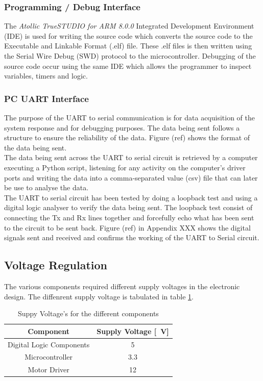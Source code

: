 \subsubsection{Programming / Debug Interface}
The \textit{Atollic TrueSTUDIO for ARM 8.0.0} Integrated Development Environment (IDE) is used for writing the source code which converts the source code to the Executable and Linkable Format (.elf) file. These .elf files is then written using the Serial Wire Debug (SWD) protocol to the microcontroller. Debugging of the source code occur using the same IDE which allows the programmer to inspect variables, timers and logic.

\subsubsection{PC UART Interface }

The purpose of the UART to serial communication is for data acquisition of the system response and for debugging purposes. The data being sent follows a structure to ensure the reliability of the data. Figure (ref) shows the format of the data being sent.\\

The data being sent across the UART to serial circuit is retrieved by a computer executing a Python script, listening for any activity on the computer's driver ports and writing the data into a comma-separated value (csv) file that can later be use to analyse the data.\\

The UART to serial circuit has been tested by doing a loopback test and using a digital logic analyser to verify the data being sent. The loopback test consist of connecting the Tx and Rx lines together and forcefully echo what has been sent to the circuit to be sent back. Figure (ref) in Appendix XXX shows the digital signals sent and received and confirms the working of the UART to Serial circuit. 

\subsection{Voltage Regulation}

The various components required different supply voltages in the electronic design. The diffenrent supply voltage is tabulated in table \ref{table:supplyVoltage}.

\begin{table}[]
	\centering
	\begin{tabular}{|c|c|}
		\hline
		Component & Supply Voltage [\SI{}{V}] \\
		\hline
		\hline
		Digital Logic Components & \SI{5}{} \\
		\hline
		Microcontroller & \SI{3.3}{} \\
		\hline
		Motor Driver & \SI{12}{} \\
		\hline
	\end{tabular}
	\caption{Suppy Voltage's for the different components}
	\label{table:supplyVoltage}
\end{table}


